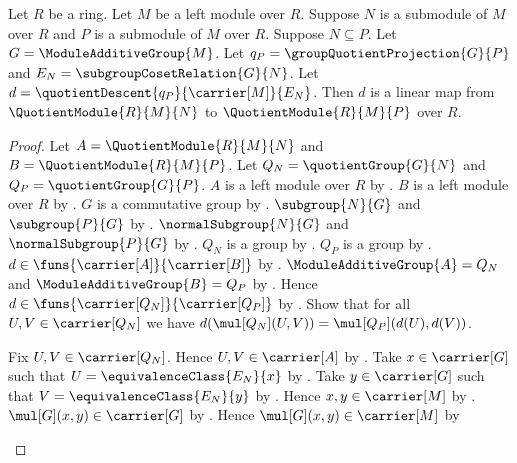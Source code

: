 \begin{theorem}\label{module_quotient_comparison_linear}
    Let $R$ be a ring.
    Let $M$ be a left module over $R$.
    Suppose $N$ is a submodule of $M$ over $R$ and
        $P$ is a submodule of $M$ over $R$.
    Suppose $N\subseteq P$.
    Let $G=\ModuleAdditiveGroup{M}$.
    Let $q_P=\groupQuotientProjection{G}{P}$ and
        $E_N=\subgroupCosetRelation{G}{N}$.
    Let $d=\quotientDescent{q_P}{\carrier[M]}{E_N}$.
    Then $d$ is a linear map from $\QuotientModule{R}{M}{N}$ to
        $\QuotientModule{R}{M}{P}$ over $R$.
\end{theorem}
\begin{proof}
    Let $A=\QuotientModule{R}{M}{N}$ and
        $B=\QuotientModule{R}{M}{P}$.
    Let $Q_N=\quotientGroup{G}{N}$ and
        $Q_P=\quotientGroup{G}{P}$.
    $A$ is a left module over $R$ by
        .
    $B$ is a left module over $R$ by
        .
    $G$ is a commutative group by
        .
    $\subgroup{N}{G}$ and $\subgroup{P}{G}$ by
        .
    $\normalSubgroup{N}{G}$ and $\normalSubgroup{P}{G}$ by
        .
    $Q_N$ is a group by .
    $Q_P$ is a group by .
    $d\in\funs{\carrier[A]}{\carrier[B]}$ by
        .
    $\ModuleAdditiveGroup{A}=Q_N$ and
        $\ModuleAdditiveGroup{B}=Q_P$ by
        .
    Hence $d\in\funs{\carrier[Q_N]}{\carrier[Q_P]}$ by
        .
    Show that for all $U,V\in\carrier[Q_N]$ we have
        $d(\mul[Q_N](U,V))=\mul[Q_P](d(U),d(V))$.
    \begin{subproof}
        Fix $U,V\in\carrier[Q_N]$.
        Hence $U,V\in\carrier[A]$ by
            .
        Take $x\in\carrier[G]$ such that
            $U=\equivalenceClass{E_N}{x}$ by
            .
        Take $y\in\carrier[G]$ such that
            $V=\equivalenceClass{E_N}{y}$ by
            .
        Hence $x,y\in\carrier[M]$ by
            .
        $\mul[G](x,y)\in\carrier[G]$ by
            .
        Hence $\mul[G](x,y)\in\carrier[M]$ by

\end{subproof}
\end{proof}
